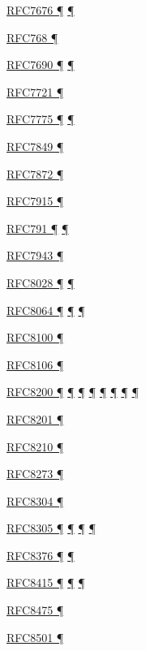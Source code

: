 \documentclass[
]{article}
\begin{document}
\hyperref[layer-2-functions]{RFC7676 ¶} \hyperref[tunnels]{¶}

\hyperref[transport-protocols]{RFC768 ¶}

\hyperref[extension-headers-and-options]{RFC7690 ¶}
\hyperref[packet-size-and-jumbo-frames]{¶}

\hyperref[security-operation]{RFC7721 ¶}

\hyperref[routing]{RFC7775 ¶} \hyperref[routing-operation]{¶}

\hyperref[layer-2-considerations]{RFC7849 ¶}

\hyperref[extension-headers-and-options]{RFC7872 ¶}

\hyperref[translation-and-ipv4-as-a-service]{RFC7915 ¶}

\hyperref[why-version-6]{RFC791 ¶}
\hyperref[traffic-class-and-flow-label]{¶}

\hyperref[security-operation]{RFC7943 ¶}

\hyperref[auto-configuration]{RFC8028 ¶}
\hyperref[multi-prefix-operation]{¶}

\hyperref[addresses]{RFC8064 ¶} \hyperref[auto-configuration]{¶}
\hyperref[layer-2-functions]{¶}

\hyperref[traffic-class-and-flow-label]{RFC8100 ¶}

\hyperref[auto-configuration]{RFC8106 ¶}

\hyperref[how-to-keep-up-to-date]{RFC8200 ¶}
\hyperref[ipv6-basic-technology]{¶} \hyperref[address-resolution]{¶}
\hyperref[extension-headers-and-options]{¶} \hyperref[packet-format]{¶}
\hyperref[filtering]{¶} \hyperref[further-reading]{¶}
\hyperref[markdown-usage]{¶}

\hyperref[packet-size-and-jumbo-frames]{RFC8201 ¶}

\hyperref[filtering]{RFC8210 ¶}

\hyperref[prefix-per-host]{RFC8273 ¶}

\hyperref[transport-protocols]{RFC8304 ¶}

\hyperref[how-an-application-programmer-sees-ipv6]{RFC8305 ¶}
\hyperref[dual-stack-scenarios]{¶} \hyperref[multihoming]{¶}
\hyperref[deployment-in-the-home]{¶}

\hyperref[layer-2-functions]{RFC8376 ¶} \hyperref[energy-consumption]{¶}

\hyperref[managed-configuration]{RFC8415 ¶}
\hyperref[address-planning]{¶} \hyperref[prefix-per-host]{¶}

\hyperref[multi-prefix-operation]{RFC8475 ¶}

\hyperref[dns]{RFC8501 ¶}
\end{document}
